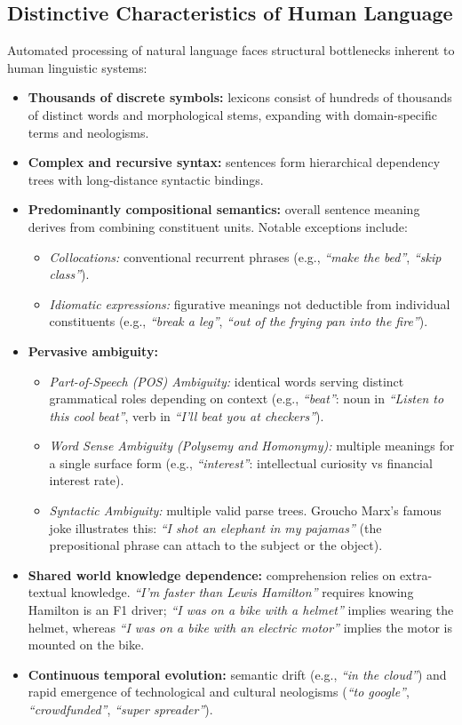\subsection{Distinctive Characteristics of Human Language}
Automated processing of natural language faces structural bottlenecks inherent to human linguistic systems:
\begin{itemize}
    \item \textbf{Thousands of discrete symbols:} lexicons consist of hundreds of thousands of distinct words and morphological stems, expanding with domain-specific terms and neologisms.
    \item \textbf{Complex and recursive syntax:} sentences form hierarchical dependency trees with long-distance syntactic bindings.
    \item \textbf{Predominantly compositional semantics:} overall sentence meaning derives from combining constituent units. Notable exceptions include:
    \begin{itemize}
        \item \textit{Collocations:} conventional recurrent phrases (e.g., \textit{``make the bed''}, \textit{``skip class''}).
        \item \textit{Idiomatic expressions:} figurative meanings not deductible from individual constituents (e.g., \textit{``break a leg''}, \textit{``out of the frying pan into the fire''}).
    \end{itemize}
    \item \textbf{Pervasive ambiguity:}
    \begin{itemize}
        \item \textit{Part-of-Speech (POS) Ambiguity:} identical words serving distinct grammatical roles depending on context (e.g., \textit{``beat''}: noun in \textit{``Listen to this cool beat''}, verb in \textit{``I'll beat you at checkers''}).
        \item \textit{Word Sense Ambiguity (Polysemy and Homonymy):} multiple meanings for a single surface form (e.g., \textit{``interest''}: intellectual curiosity vs financial interest rate).
        \item \textit{Syntactic Ambiguity:} multiple valid parse trees. Groucho Marx's famous joke illustrates this: \textit{``I shot an elephant in my pajamas''} (the prepositional phrase can attach to the subject or the object).
    \end{itemize}
    \item \textbf{Shared world knowledge dependence:} comprehension relies on extra-textual knowledge. \textit{``I'm faster than Lewis Hamilton''} requires knowing Hamilton is an F1 driver; \textit{``I was on a bike with a helmet''} implies wearing the helmet, whereas \textit{``I was on a bike with an electric motor''} implies the motor is mounted on the bike.
    \item \textbf{Continuous temporal evolution:} semantic drift (e.g., \textit{``in the cloud''}) and rapid emergence of technological and cultural neologisms (\textit{``to google''}, \textit{``crowdfunded''}, \textit{``super spreader''}).
\end{itemize}

